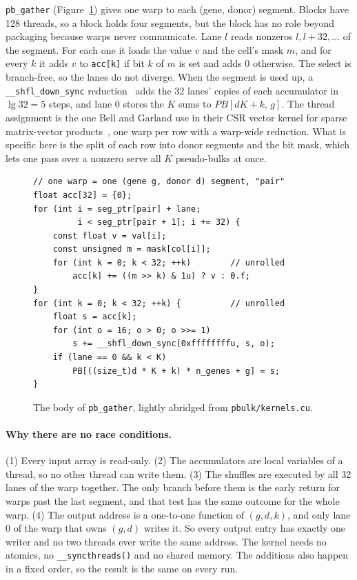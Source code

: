 \documentclass[sigconf,nonacm]{acmart}
\newcommand{\code}[1]{\texttt{#1}}
\newcommand{\file}[1]{{\urlstyle{tt}\nolinkurl{#1}}}   %
\begin{document}
\code{pb\_gather} (Figure~\ref{fig:code}) gives one warp to each (gene, donor) segment. Blocks have
128 threads, so a block holds four segments, but the block has no role beyond packaging because
warps never communicate. Lane $l$ reads nonzeros
$l, l+32, \dots$ of the segment. For each one it loads the value $v$ and the cell's mask $m$, and for
every $k$ it adds $v$ to \code{acc[k]} if bit $k$ of $m$ is set and adds $0$ otherwise. The select is
branch-free, so the lanes do not diverge. When the segment is used up, a
\code{\_\_shfl\_down\_sync} reduction~\cite{cudaguide} adds the 32 lanes' copies of each accumulator in
$\lg 32 = 5$ steps, and lane 0 stores the $K$ sums to $PB[dK+k,\,g]$. The thread assignment is the
one Bell and Garland use in their CSR vector kernel for sparse matrix-vector
products~\cite{bell2008}, one warp per row with a warp-wide reduction. What is specific here is the
split of each row into donor segments and the bit mask, which lets one pass over a nonzero serve all
$K$ pseudo-bulks at once.

\begin{figure}[t]
\footnotesize
\begin{verbatim}
// one warp = one (gene g, donor d) segment, "pair"
float acc[32] = {0};
for (int i = seg_ptr[pair] + lane;
         i < seg_ptr[pair + 1]; i += 32) {
    const float v = val[i];
    const unsigned m = mask[col[i]];
    for (int k = 0; k < 32; ++k)        // unrolled
        acc[k] += ((m >> k) & 1u) ? v : 0.f;
}
for (int k = 0; k < 32; ++k) {          // unrolled
    float s = acc[k];
    for (int o = 16; o > 0; o >>= 1)
        s += __shfl_down_sync(0xffffffffu, s, o);
    if (lane == 0 && k < K)
        PB[((size_t)d * K + k) * n_genes + g] = s;
}
\end{verbatim}
\caption{The body of \code{pb\_gather}, lightly abridged from \file{pbulk/kernels.cu}.}
\label{fig:code}
\end{figure}

\paragraph{Why there are no race conditions.} (1) Every input array is read-only. (2) The
accumulators are local variables of a thread, so no other thread can write them. (3) The shuffles are
executed by all 32 lanes of the warp together. The only branch before them is the early return for
warps past the last segment, and that test has the same outcome for the whole warp. (4) The output
address is a one-to-one function of $(g, d, k)$, and only lane 0 of the warp that owns $(g, d)$
writes it. So every output entry has exactly one writer and no two threads ever write the same
address. The kernel needs no atomics, no \code{\_\_syncthreads()} and no shared memory. The additions
also happen in a fixed order, so the result is the same on every run.
\end{document}
